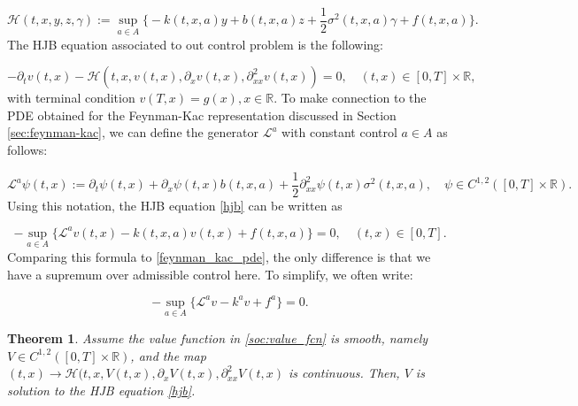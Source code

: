 \documentclass{article}
\newtheorem{theorem}{Theorem}
\begin{document}
\begin{equation}
\mathcal{H}(t,x,y,z,\gamma):=\sup_{a\in A}\Big\{-k(t,x,a)y+b(t,x,a)z+\frac{1}{2}\sigma^2(t,x,a)\gamma+f(t,x,a)\Big\}.
\end{equation}
The HJB equation associated to out control problem is the following:

\begin{equation} \label{hjb}
-\partial_tv(t,x)-\mathcal{H}(t,x,v(t,x),\partial_xv(t,x),\partial^2_{xx}v(t,x))=0, \quad (t,x)\in[0,T]\times\mathbb{R},
\end{equation}
with terminal condition $v(T,x)=g(x),x\in\mathbb{R}$. To make connection to the PDE obtained for the Feynman-Kac representation discussed in Section \ref{sec:feynman-kac}, we can define the generator $\mathcal{L}^a$ with constant control $a\in A$ as follows:

\begin{equation}
\mathcal{L}^a\psi(t,x):=\partial_t\psi(t,x)+\partial_x\psi(t,x)b(t,x,a)+\frac{1}{2}\partial^2_{xx}\psi(t,x)\sigma^2(t,x,a), \quad\psi\in C^{1,2}([0,T]\times\mathbb{R}).
\end{equation}
Using this notation, the HJB equation \eqref{hjb} can be written as 

\begin{equation}
-\sup_{a\in A}\{\mathcal{L}^av(t,x)-k(t,x,a)v(t,x)+f(t,x,a)\}=0, \quad (t,x)\in[0,T].
\end{equation}
Comparing this formula to \eqref{feynman_kac_pde}, the only difference is that we have a supremum over admissible control here. To simplify, we often write:

\begin{equation} \label{hjb_simple}
-\sup_{a\in A}\{\mathcal{L}^av-k^av+f^a\}=0.
\end{equation}

\begin{theorem}
Assume the value function in \eqref{soc:value_fcn} is smooth, namely $V\in C^{1,2}([0,T]\times\mathbb{R})$, and the map $(t,x)\rightarrow\mathcal{H}(t,x,V(t,x),\partial_xV(t,x),\partial^2_{xx}V(t,x)$ is continuous. Then, $V$ is solution to the HJB equation \eqref{hjb}.
\end{theorem}
\end{document}
